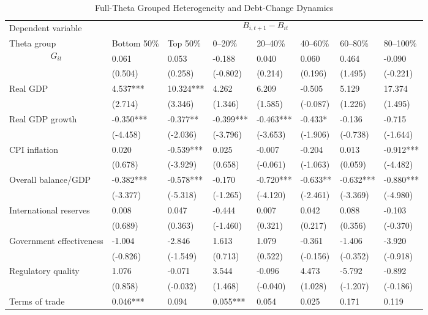 \begin{table}[H]\centering
\begin{threeparttable}
\caption{Full-Theta Grouped Heterogeneity and Debt-Change Dynamics}
\label{tab:theta_group_heterogeneity_debt}
\scriptsize
\begin{tabularx}{\textwidth}{lYYYYYYY}
\toprule
Dependent variable &  \\
\cmidrule(lr){2-8}
Theta group & Bottom 50\% & Top 50\% & 0--20\% & 20--40\% & 40--60\% & 60--80\% & 80--100\% \\
\midrule
$$G_{it}$$ & 0.061 & 0.053 & -0.188 & 0.040 & 0.060 & 0.464 & -0.090 \\
  & (0.504) & (0.258) & (-0.802) & (0.214) & (0.196) & (1.495) & (-0.221) \\
Real GDP & 4.537*** & 10.324*** & 4.262 & 6.209 & -0.505 & 5.129 & 17.374 \\
  & (2.714) & (3.346) & (1.346) & (1.585) & (-0.087) & (1.226) & (1.495) \\
Real GDP growth & -0.350*** & -0.377** & -0.399*** & -0.463*** & -0.433* & -0.136 & -0.715 \\
  & (-4.458) & (-2.036) & (-3.796) & (-3.653) & (-1.906) & (-0.738) & (-1.644) \\
CPI inflation & 0.020 & -0.539*** & 0.025 & -0.007 & -0.204 & 0.013 & -0.912*** \\
  & (0.678) & (-3.929) & (0.658) & (-0.061) & (-1.063) & (0.059) & (-4.482) \\
Overall balance/GDP & -0.382*** & -0.578*** & -0.170 & -0.720*** & -0.633** & -0.632*** & -0.880*** \\
  & (-3.377) & (-5.318) & (-1.265) & (-4.120) & (-2.461) & (-3.369) & (-4.980) \\
International reserves & 0.008 & 0.047 & -0.444 & 0.007 & 0.042 & 0.088 & -0.103 \\
  & (0.689) & (0.363) & (-1.460) & (0.321) & (0.217) & (0.356) & (-0.370) \\
Government effectiveness & -1.004 & -2.846 & 1.613 & 1.079 & -0.361 & -1.406 & -3.920 \\
  & (-0.826) & (-1.549) & (0.713) & (0.522) & (-0.156) & (-0.352) & (-0.918) \\
Regulatory quality & 1.076 & -0.071 & 3.544 & -0.096 & 4.473 & -5.792 & -0.892 \\
  & (0.858) & (-0.032) & (1.468) & (-0.040) & (1.028) & (-1.207) & (-0.186) \\
Terms of trade & 0.046*** & 0.094 & 0.055*** & 0.054 & 0.025 & 0.171 & 0.119 \\

\end{tabularx}
\end{threeparttable}
\end{table}
